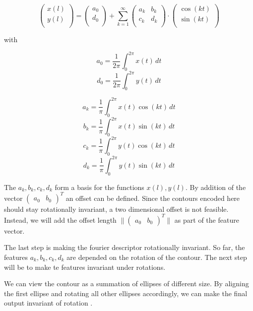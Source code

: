$$
\begin{pmatrix}
  x(l) \\
  y(l) \\
\end{pmatrix}
=
\begin{pmatrix}
  a_0 \\
  d_0 \\
\end{pmatrix}
+
\sum_{k=1}^\infty 
\begin{pmatrix}
  a_k & b_k\\
  c_k & d_k\\
\end{pmatrix}
\cdot
\begin{pmatrix}
  \cos(kt)\\
  \sin(kt)\\
\end{pmatrix}
$$

with

$$
a_0 = \frac{1}{2\pi} \int_{0}^{2 \pi}  x(t) \,dt 
$$
$$
d_0 = \frac{1}{2\pi} \int_{0}^{2 \pi}  y(t) \,dt 
$$

$$
a_k = \frac{1}{\pi} \int_{0}^{2 \pi}  x(t) \cos(kt) \,dt 
$$
$$
b_k = \frac{1}{\pi} \int_{0}^{2 \pi}  x(t) \sin(kt) \,dt 
$$
$$
c_k = \frac{1}{\pi} \int_{0}^{2 \pi}  y(t) \cos(kt) \,dt 
$$
$$
d_k = \frac{1}{\pi} \int_{0}^{2 \pi}  y(t) \sin(kt )\,dt 
$$

The $a_k, b_k, c_k, d_k$ form a basis for the functions $x(l), y(l)$.
By addition of the vector $ \begin{pmatrix} a_0 & b_0 \end{pmatrix}^T $ an offset can be defined.
Since the contours encoded here should stay rotationally invariant, a two dimensional offset is not feasible.
Instead, we will add the offset length $\|  \begin{pmatrix} a_0 & b_0 \end{pmatrix}^T \| $ as part of the feature vector.

The last step is making the fourier descriptor rotationally invariant.
So far, the features $a_k, b_k, c_k, d_k$ are depended on the rotation of the contour.
The next step will be to make te features invariant under rotations.

We can view the contour as a summation of ellipses of different size.
By aligning the first ellipse and rotating all other ellipses accordingly, we can make the final output invariant
of rotation \cite{MEBA}.

